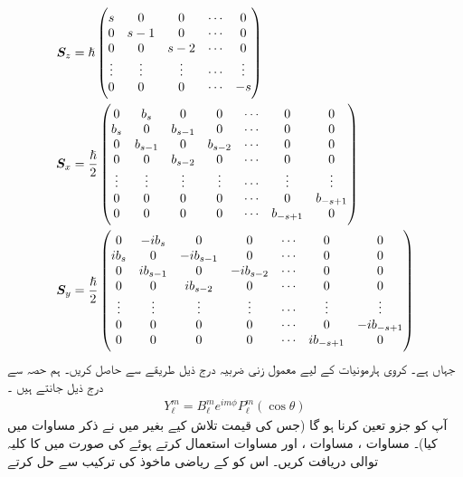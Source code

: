 \begin{align*}
    {\ensuremath{{\boldsymbol{S}}}}_z&=\hslash \begin{pmatrix}
    s&0&0&\cdots&0\\0&s-1&0&\cdots&0\\0&0&s-2&\cdots&0\\\vdots&\vdots&\vdots&\cdots&\vdots\\0&0&0&\cdots&-s
    \end{pmatrix} \\ 
    {{\boldsymbol{S}}}_x&=\frac{\hslash}{2}\begin{pmatrix}0&b_s&0&0&\cdots&0&0\\b_s&0&b_{s-1}&0&\cdots&0&0\\0&b_{s-1}&0&b_{s-2}&\cdots&0&0\\0&0&b_{s-2}&0&\cdots&0&0\\\vdots&\vdots&\vdots&\vdots&\cdots&\vdots&\vdots\\0&0&0&0&\cdots&0&b_{-s+1}\\0&0&0&0&\cdots&b_{-s+1}&0\end{pmatrix} \\
    {{\boldsymbol{S}}}_y&=\frac{\hslash}{2}\begin{pmatrix}0&-i b_s&0&0&\cdots&0&0\\i b_s&0&-i b_{s-1}&0&\cdots&0&0\\0&i b_{s-1}&0&-i b_{s-2}&\cdots&0&0\\0&0&i b_{s-2}&0&\cdots&0&0\\\vdots&\vdots&\vdots&\vdots&\cdots&\vdots&\vdots\\0&0&0&0&\cdots&0&-i b_{-s+1}\\0&0&0&0&\cdots&i b_{-s+1}&0
    \end{pmatrix}
\end{align*} 
جہاں    ہے۔
کروی ہارمونیات کے لیے معمول زنی  ضربیہ  درج ذیل طریقے سے حاصل کریں۔ ہم حصہ سے درج ذیل جانتے ہیں ۔
\begin{align*} 
    Y_{\ell}^{m}=B_{\ell}^{m}e^{i m\phi}P_{\ell}    ^{m}(\cos\theta)
\end{align*} 
آپ کو جزو   تعین کرنا ہو گا (جس کی قیمت تلاش کیے بغیر میں نے ذکر مساوات     میں کیا)۔ مساوات ، مساوات ،   اور مساوات   استعمال کرتے ہوئے    کی صورت  میں    کا کلیہ توالی دریافت کریں۔ اس کو  کے ریاضی ماخوذ  کی ترکیب سے حل کرتے
